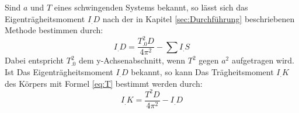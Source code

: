 Sind $a$ und $T$ eines schwingenden Systems bekannt, so lässt sich das Eigenträgheitsmoment $I_.D$ nach der in Kapitel \ref{sec:Durchführung} beschriebenen Methode bestimmen durch:
\begin{equation}
I_.D = \frac{T_.0^2D}{4\pi^2}-\sum I_.S \label{eq:I_D}
\end{equation}
Dabei entspricht $T_.0^2$ dem y-Achsenabschnitt, wenn $T^2$ gegen $a^2$ aufgetragen wird.
Ist Das Eigenträgheitsmoment $I_.D$ bekannt, so kann Das Trägheitsmoment $I_.K$ des Körpers mit Formel \eqref{eq:T} bestimmt werden durch:
\begin{equation}
I_.K = \frac{T^2D}{4\pi^2}-I_.D  \label{eq:I_K}
\end{equation}